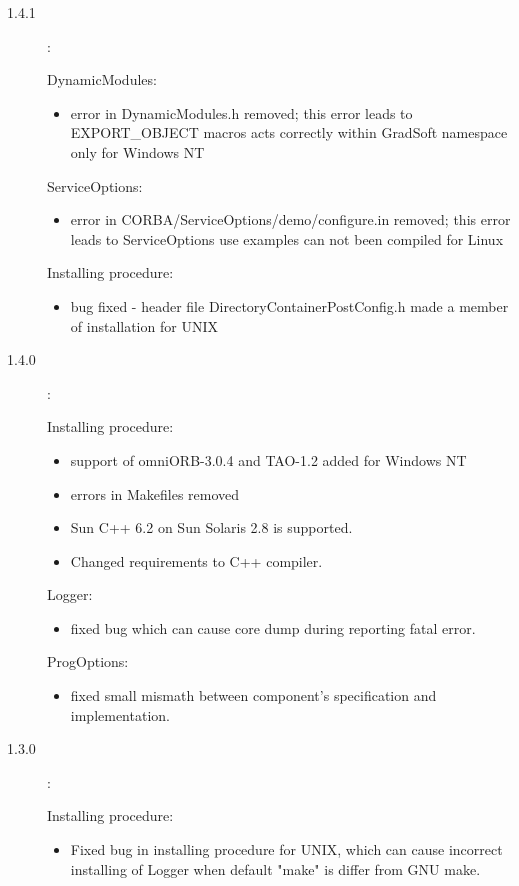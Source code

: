 \documentclass[10pt]{article}
\newenvironment{component}[1]{\par#1:\begin{itemize}}{\end{itemize}}
\begin{document}
\begin{description}
 \item [1.4.1]:
       \begin{component}{DynamicModules}
                     \item error in DynamicModules.h removed;
                           this error leads to EXPORT\_OBJECT macros
                           acts correctly within GradSoft namespace only for Windows NT 
       \end{component}
       \begin{component}{ServiceOptions}
                     \item error in CORBA/ServiceOptions/demo/configure.in removed;
                           this error leads to ServiceOptions use examples
                           can not been compiled for Linux
       \end{component}
       \begin{component}{Installing procedure}
                     \item bug fixed - header file DirectoryContainerPostConfig.h
                           made a member of installation for UNIX
       \end{component}

 \item [1.4.0]:

       \begin{component}{Installing procedure}
          \item support of omniORB-3.0.4 and TAO-1.2 added for Windows NT
          \item errors in Makefiles removed
          \item Sun C++ 6.2 on Sun Solaris 2.8 is supported.
          \item Changed requirements to C++ compiler.
       \end{component}

       \begin{component}{Logger}
          \item fixed bug which can cause core dump during reporting fatal error.
       \end{component}

       \begin{component}{ProgOptions}
          \item fixed small mismath between component's specification and implementation.
       \end{component}

 \item [1.3.0]: 
       \begin{component}{Installing procedure}
         \item Fixed bug in installing procedure for UNIX,
               which can cause incorrect installing of Logger
               when default "make" is differ from GNU make.
       \end{component}


\end{description}
\end{document}
